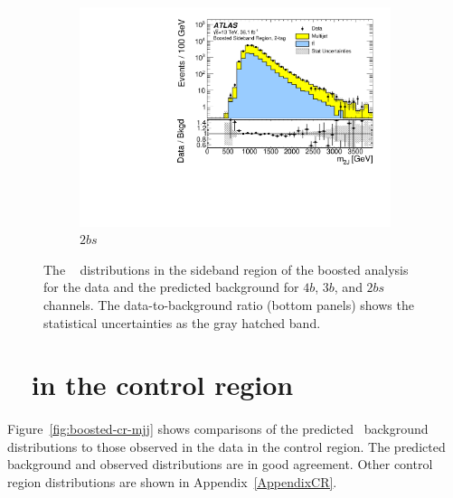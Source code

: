 \begin{figure}[htbp!]
    \\
    \begin{subfigure}[b]{0.35\textwidth}
        \includegraphics[width=\textwidth,angle=-90]{figures/boosted/Paperplot/Moriond_bkg_9_TwoTag_split_Sideband_mHH_l_1.pdf}
        \caption{$2bs$}
        \label{fig:boosted-sb-mjj-2bs}
    \end{subfigure}
   \caption{The \mtwoJ~ distributions in the sideband region of the boosted analysis for the data and the predicted background for $4b$, $3b$, and $2bs$ channels. The data-to-background ratio (bottom panels) shows the statistical uncertainties as the gray hatched band.}
  \label{fig:boosted-sb-mjj}
\end{figure}


\clearpage
\section{\mtwoJ~ in the control region}
\label{sec:boosted-cr}

\paragraph{}
Figure~\ref{fig:boosted-cr-mjj} shows comparisons of the predicted \mtwoJ~background distributions to those observed in the data in the control region.
The predicted background and observed distributions are in good agreement.
Other control region distributions are shown in Appendix~\ref{AppendixCR}.

